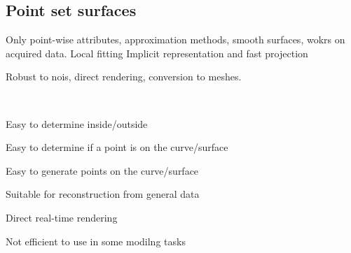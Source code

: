 \begin{compactdesc}
			\section{Point set surfaces}
	Only point-wise attributes, approximation methods, smooth surfaces, wokrs on acquired data. Local fitting
	Implicit representation and fast projection
	\item[\lp{Properties}] Robust to nois, direct rendering, conversion to meshes.
	\item[\lp{Advantages}]\hfill\\
	\begin{enumerate*}[label=\protect\circled{\arabic*},itemjoin=]
		\item Easy to determine inside/outside\\
		\item Easy to determine if a point is on the curve/surface\\
		\item Easy to generate points on the curve/surface\\
		\item Suitable for reconstruction from general data\\
		\item Direct real-time rendering\\
		\item Not efficient to use in some modilng tasks
	\end{enumerate*}

\end{compactdesc}
